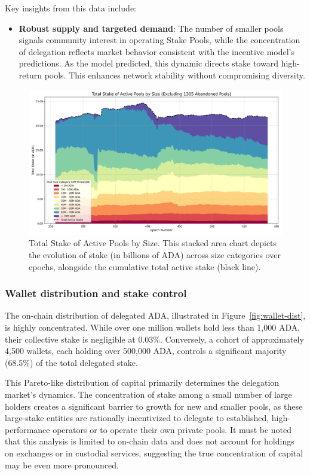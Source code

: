 \documentclass[11pt, letterpaper]{article}
\begin{document}
Key insights from this data include:

\begin{itemize}
	\item \textbf{Robust supply and targeted demand}: The number of smaller pools signals community
	      interest in operating Stake Pools, while the concentration of delegation reflects market
	      behavior consistent with the incentive model’s predictions. As the model predicted, this dynamic
	      directs stake toward high-return pools. This enhances network stability without compromising diversity.
\end{itemize}

\begin{figure}[H]
	\centering
	\includegraphics[width=\textwidth]{img/stake_control_by_size.png}
	\caption{Total Stake of Active Pools by Size. This stacked area chart depicts
		the evolution of stake (in billions of ADA) across size categories over epochs,
		alongside the cumulative total active stake (black line).}\label{fig:stake-control}
\end{figure}

\newpage
\subsubsection{Wallet distribution and stake control}

The on-chain distribution of delegated ADA, illustrated in Figure~\ref{fig:wallet-dist}, is highly concentrated. While over one million wallets
hold less than 1,000 ADA, their collective stake is negligible at 0.03\%.
Conversely, a cohort of approximately 4,500 wallets, each holding over 500,000
ADA, controls a significant majority (68.5\%) of the total delegated stake.

This Pareto-like distribution of capital primarily determines the delegation market's dynamics.
The concentration of stake among a small number of large holders creates a significant barrier
to growth for new and smaller pools, as these large-stake entities are rationally incentivized to delegate to
established, high-performance operators or to operate their own private pools.
It must be noted that this analysis is limited to on-chain data and does not account for holdings
on exchanges or in custodial services, suggesting the true concentration of capital may be even more pronounced.
\end{document}
